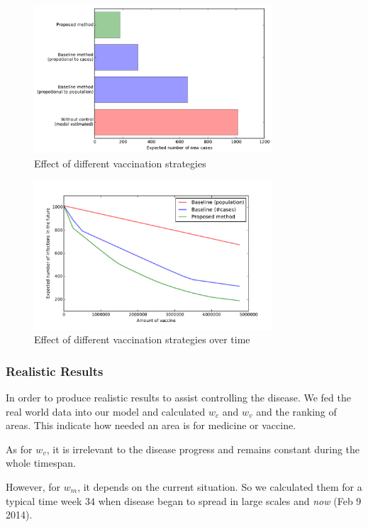 \documentclass[11pt]{article}
\begin{document}
\begin{figure}[hbtp]
\begin{center}
  \includegraphics[width=3.5in]{graph/res4.pdf}
  \caption{Effect of different vaccination strategies}
  \label{med2}
\end{center}  
\end{figure}



\begin{figure}[hbtp]
\begin{center}
  \includegraphics[width=3.5in]{graph/ev2.pdf}
  \caption{Effect of different vaccination strategies over time}
  \label{ev2}
\end{center}  
\end{figure}


\subsubsection{Realistic Results}

In order to produce realistic results to assist controlling the disease. We fed the real world data into our model and calculated $w_c$ and $w_v$ and the ranking of areas. This indicate how needed an area is for medicine or vaccine. 

As for $w_v$, it is irrelevant to the disease progress and remains constant during the whole timespan.

However, for $w_m$, it depends on the current situation. So we calculated them for a typical time week $34$ when disease began to spread in large scales and \emph{now} (Feb 9 2014).
\end{document}
